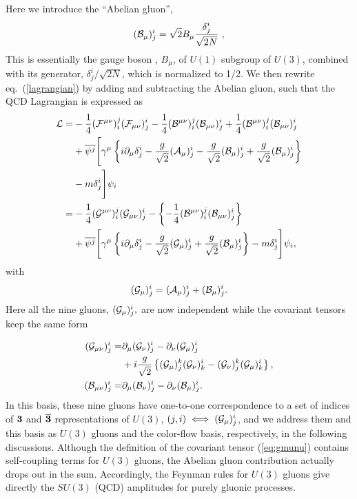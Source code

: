 Here we introduce the ``Abelian gluon'',
\begin{align}
 ({\cal B}_{\mu})^i_j=\sqrt{2}B_{\mu}\frac{\delta^i_j}{\sqrt{2N}}\,\,,
\end{align}
This is essentially the gauge boson , $B_{\mu}$, of $U(1)$ subgroup of $U(3)$, combined with its generator, $\delta^i_j/\sqrt{2N}$, which is normalized to 1/2.  We then rewrite
eq.~(\ref{lagrangian}) by adding and subtracting the Abelian gluon,
such that the QCD Lagrangian is expressed as
\begin{align}
 {\cal L}=&-\frac{1}{4}({\cal F}^{\mu\nu})^j_i({\cal
 F}_{\mu\nu})^i_j
-\frac{1}{4}({\cal B}^{\mu\nu})^j_i({\cal
 B}_{\mu\nu})^i_j
+\frac{1}{4}({\cal B}^{\mu\nu})^j_i({\cal B}_{\mu\nu})^i_j\nonumber\\
&+\overline{\psi^j}\Biggl[\gamma^{\mu}\left\{i\partial_{\mu}\delta^i_j-\frac{g}
{\sqrt{2}}({\cal A}_{\mu})^i_j-\frac{g}{\sqrt{2}}({\cal
  B}_{\mu})^i_j+\frac{g}{\sqrt{2}}({\cal
  B}_{\mu})^i_j\right\}\nonumber \\
&-m\delta^i_j\Biggr]\psi_i\nonumber\\
=&-\frac{1}{4}({\cal G}^{\mu\nu})^j_i({\cal
 G}_{\mu\nu})^i_j
-\left\{-\frac{1}{4}({\cal B}^{\mu\nu})^j_i({\cal
 B}_{\mu\nu})^i_j\right\}\nonumber\\
&+\overline{\psi^j}\Biggl[\gamma^{\mu}\left\{i\partial_{\mu}\delta^i_j-\frac{g}
{\sqrt{2}}({\cal
  G}_{\mu})^i_j+\frac{g}{\sqrt{2}}({\cal
  B}_{\mu})^i_j\right\}-m\delta^i_j\Biggr]\psi_i
\label{eq:cflag},
\end{align}
with
\begin{align}
({\cal G}_{\mu})^i_j=({\cal A}_{\mu})^i_j+({\cal B}_{\mu})^i_j.
\end{align}
Here all the nine gluons, $({\cal G}_{\mu})^i_j,$ are now independent while the
 covariant tensors keep the same form

\begin{align}
({\cal G}_{\mu\nu})^i_j=&\partial_{\mu}({\cal G}_{\nu})^i_j
-\partial_{\nu}({\cal G}_{\mu})^i_j \nonumber\\
&+i\frac{g}{\sqrt{2}}\left\{({\cal G}_{\mu})^k_j
({\cal G}_{\nu})^i_k-({\cal G}_{\nu})^k_j
({\cal G}_{\mu})^i_k\right\}\label{eq:gmunu},\\
({\cal B}_{\mu\nu})^i_j=&\partial_{\mu}({\cal B}_{\nu})^i_j
-\partial_{\nu}({\cal B}_{\mu})^i_j\label{eq:bmunu}.
\end{align}
 In this basis, these nine gluons have one-to-one correspondence to a set
of indices of ${\bf 3}$
and ${\bf \overline{3}}$ representations of $U(3)$, $(j,i) \iff ({\cal G}_{\mu})^i_j$, and we address them and this basis as $U(3)$ gluons  and the color-flow basis, respectively, in the following discussions. Although the definition of the covariant tensor (\ref{eq:gmunu}) contains self-coupling
 terms for $U(3)$ gluons, the Abelian gluon contribution actually drops out
 in the sum. Accordingly, the Feynman rules for $U(3)$ gluons give directly the $SU(3)$ (QCD) amplitudes for purely
 gluonic processes\cite{fabio}. 

